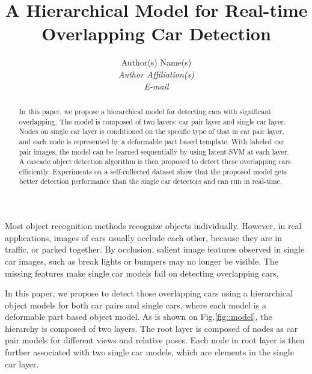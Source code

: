\documentclass[times, 10pt,twocolumn]{article}
\begin{document}
\title{A Hierarchical Model for Real-time Overlapping Car Detection}

\author{Author(s) Name(s)\\
\emph{Author Affiliation(s)}\\
\emph{E-mail}\\
}

\maketitle
\thispagestyle{empty}

\begin{abstract}
In this paper, we propose a hierarchical model for detecting cars with significant overlapping. The model is composed of two layers: car pair layer and single car layer. Nodes on single car layer is conditioned on the specific type of that in car pair layer, and  each node is represented by a deformable part based template. With labeled car pair images, the model can be learned sequentially by using latent-SVM at each layer. A cascade object detection algorithm is then proposed to detect these overlapping cars efficiently. Experiments on a self-collected dataset show that the proposed model gets better detection performance than the single car detectors and can run in real-time.
\end{abstract}




Most object recognition methods recognize objects individually. However, in real applications, images of cars usually occlude each other, because they are in traffic, or parked together. By occlusion, salient image features observed in single car images, such as break lights or bumpers may no longer be visible. The missing features make single car models fail on detecting overlapping cars.

In this paper, we propose to detect those overlapping cars using a hierarchical object models for both car pairs and single cars, where each model is a deformable part based object model. As is shown on Fig.\ref{fig::model}, the hierarchy is composed of two layers. The root layer is composed of nodes as car pair models for different views and relative poses. Each node in root layer is then further associated with two single car models, which are elements in the single car layer.
\end{document}
